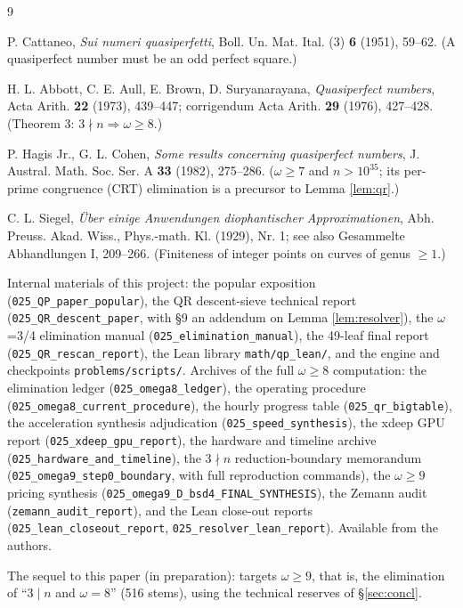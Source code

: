 \documentclass[11pt]{article}
\theoremstyle{remark}
\begin{document}
\begin{thebibliography}{9}

 P. Cattaneo, \emph{Sui numeri quasiperfetti}, Boll. Un. Mat. Ital. (3) \textbf{6} (1951), 59--62. (A quasiperfect number must be an odd perfect square.)

 H. L. Abbott, C. E. Aull, E. Brown, D. Suryanarayana, \emph{Quasiperfect numbers}, Acta Arith. \textbf{22} (1973), 439--447; corrigendum Acta Arith. \textbf{29} (1976), 427--428. (Theorem 3: $3 \nmid n \Rightarrow \omega \ge 8$.)

 P. Hagis Jr., G. L. Cohen, \emph{Some results concerning quasiperfect numbers}, J. Austral. Math. Soc. Ser. A \textbf{33} (1982), 275--286. ($\omega \ge 7$ and $n > 10^{35}$; its per-prime congruence (CRT) elimination is a precursor to Lemma \ref{lem:qr}.)

 C. L. Siegel, \emph{\"Uber einige Anwendungen diophantischer Approximationen}, Abh. Preuss. Akad. Wiss., Phys.-math. Kl. (1929), Nr. 1; see also Gesammelte Abhandlungen I, 209--266. (Finiteness of integer points on curves of genus $\ge 1$.)

 Internal materials of this project: the popular exposition (\texttt{025\_QP\_paper\_popular}), the QR descent-sieve technical report (\texttt{025\_QR\_descent\_paper}, with \S9 an addendum on Lemma \ref{lem:resolver}), the $\omega$=3/4 elimination manual (\texttt{025\_elimination\_manual}), the 49-leaf final report (\texttt{025\_QR\_rescan\_report}), the Lean library \texttt{math/qp\_lean/}, and the engine and checkpoints \texttt{problems/scripts/}. Archives of the full $\omega \ge 8$ computation: the elimination ledger (\texttt{025\_omega8\_ledger}), the operating procedure (\texttt{025\_omega8\_current\_procedure}), the hourly progress table (\texttt{025\_qr\_bigtable}), the acceleration synthesis adjudication (\texttt{025\_speed\_synthesis}), the xdeep GPU report (\texttt{025\_xdeep\_gpu\_report}), the hardware and timeline archive (\texttt{025\_hardware\_and\_timeline}), the $3 \nmid n$ reduction-boundary memorandum (\texttt{025\_omega9\_step0\_boundary}, with full reproduction commands), the $\omega \ge 9$ pricing synthesis (\texttt{025\_omega9\_D\_bsd4\_FINAL\_SYNTHESIS}), the Zemann audit (\texttt{zemann\_audit\_report}), and the Lean close-out reports (\texttt{025\_lean\_closeout\_report}, \texttt{025\_resolver\_lean\_report}). Available from the authors.

 The sequel to this paper (in preparation): targets $\omega \ge 9$, that is, the elimination of ``$3 \mid n$ and $\omega = 8$'' (516 stems), using the technical reserves of \S\ref{sec:concl}.


\end{thebibliography}
\end{document}
